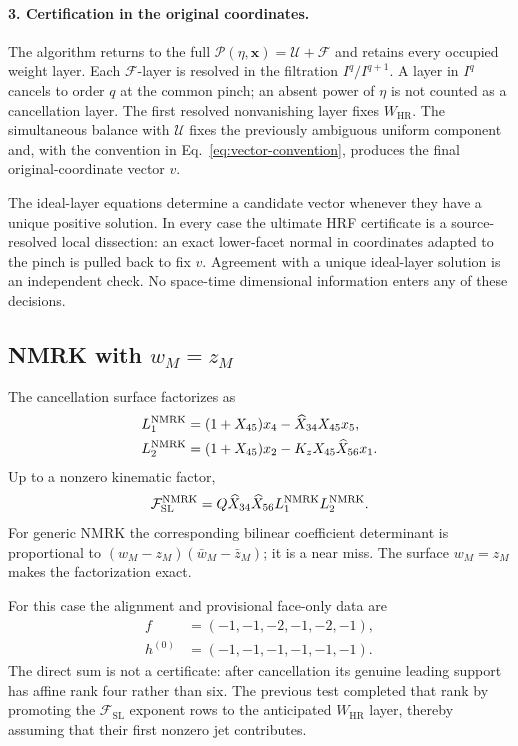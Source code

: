\documentclass[11pt]{article}
\newcommand{\F}{\mathcal F}
\newcommand{\U}{\mathcal U}
\newcommand{\Pcal}{\mathcal P}
\newcommand{\SL}{\mathrm{SL}}
\newcommand{\HR}{\mathrm{HR}}
\newcommand{\hX}{\widehat X}
\begin{document}
\paragraph{3. Certification in the original coordinates.}
The algorithm returns to the full \(\Pcal(\eta,\mathbf x)=\U+\F\) and retains
every occupied weight layer.  Each \(\F\)-layer is resolved in the filtration
\(I^q/I^{q+1}\).  A layer in \(I^q\) cancels to order \(q\) at the common
pinch; an absent power of \(\eta\) is not counted as a cancellation layer.
The first resolved nonvanishing layer fixes \(W_{\HR}\).  The simultaneous
balance with \(\U\) fixes the previously ambiguous uniform component and,
with the convention in Eq.~\eqref{eq:vector-convention}, produces the final
original-coordinate vector \(v\).

The ideal-layer equations determine a candidate vector whenever they have a
unique positive solution.  In every case the ultimate HRF certificate is a
source-resolved local dissection: an exact lower-facet normal in coordinates
adapted to the pinch is pulled back to fix \(v\).  Agreement with a unique
ideal-layer solution is an independent check.  No space-time dimensional
information enters any of these decisions.

\subsection{NMRK with \texorpdfstring{\(w_M=z_M\)}{wM=zM}}

The cancellation surface factorizes as
\begin{align}
 L_1^{\rm NMRK}&=(1+X_{45})x_4-\hX_{34}X_{45}x_5,\nonumber\\
 L_2^{\rm NMRK}&=(1+X_{45})x_2-K_zX_{45}\hX_{56}x_1.
 \label{eq:nmrk-factors}
\end{align}
Up to a nonzero kinematic factor,
\begin{equation}
 \F_{\SL}^{\rm NMRK}=Q\hX_{34}\hX_{56}
 L_1^{\rm NMRK}L_2^{\rm NMRK}.
 \label{eq:nmrk-fsl}
\end{equation}
For generic NMRK the corresponding bilinear coefficient determinant is
proportional to
\((w_M-z_M)(\bar w_M-\bar z_M)\); it is a near miss.  The surface
\(w_M=z_M\) makes the
factorization exact.

For this case the alignment and provisional face-only data are
\begin{align*}
 f&=(-1,-1,-2,-1,-2,-1),\\
 h^{(0)}&=(-1,-1,-1,-1,-1,-1).
\end{align*}
The direct sum is not a certificate: after cancellation its genuine leading
support has affine rank four rather than six.  The previous test completed
that rank by promoting the \(\F_{\SL}\) exponent rows to the anticipated
\(W_{\HR}\) layer, thereby assuming that their first nonzero jet contributes.
\end{document}
